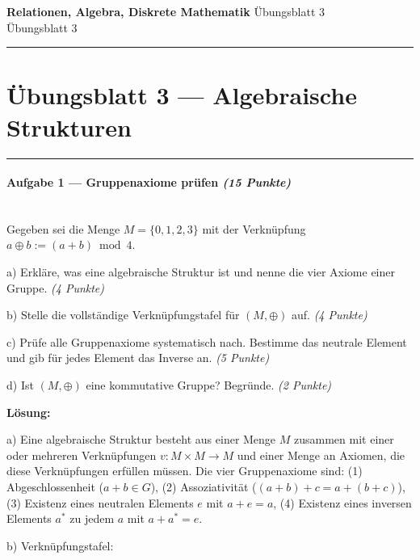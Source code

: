 \documentclass[11pt, a4paper]{article}
\providecommand{\nichttitle}{Übungsblatt}
\providecommand{\nichtsubtitle}{}
\renewcommand{\nichttitle}{Relationen, Algebra, Diskrete Mathematik}
\renewcommand{\nichtsubtitle}{Übungsblatt 3}
\begin{document}
\begin{center}
{\Large\bfseries\color{accent}\nichttitle}
\ifx\nichtsubtitle\empty\else
  \\[2pt]{\normalsize\color{accent!80!black}\nichtsubtitle}
\fi
\\[2pt]
\color{accent}\rule{0.4\linewidth}{0.8pt}\color{black}
\end{center}
\vspace{4pt}


\section{Übungsblatt 3 — Algebraische Strukturen}


\noindent\textcolor{rulegray}{\rule{\linewidth}{0.4pt}}


\paragraph{Aufgabe 1 — Gruppenaxiome prüfen \textit{(15 Punkte)}}\mbox{}\\[2pt]

Gegeben sei die Menge $M = \{0, 1, 2, 3\}$ mit der Verknüpfung $a \oplus b := (a+b) \bmod 4$.


a) Erkläre, was eine algebraische Struktur ist und nenne die vier Axiome einer Gruppe. \textit{(4 Punkte)}


b) Stelle die vollständige Verknüpfungstafel für $(M, \oplus)$ auf. \textit{(4 Punkte)}


c) Prüfe alle Gruppenaxiome systematisch nach. Bestimme das neutrale Element und gib für jedes Element das Inverse an. \textit{(5 Punkte)}


d) Ist $(M, \oplus)$ eine kommutative Gruppe? Begründe. \textit{(2 Punkte)}


\textbf{Lösung:}


a) Eine algebraische Struktur besteht aus einer Menge $M$ zusammen mit einer oder mehreren Verknüpfungen $v: M \times M \to M$ und einer Menge an Axiomen, die diese Verknüpfungen erfüllen müssen. Die vier Gruppenaxiome sind: (1) Abgeschlossenheit ($a+b \in G$), (2) Assoziativität ($(a+b)+c = a+(b+c)$), (3) Existenz eines neutralen Elements $e$ mit $a+e = a$, (4) Existenz eines inversen Elements $a^*$ zu jedem $a$ mit $a+a^* = e$.


b) Verknüpfungstafel:
\end{document}
